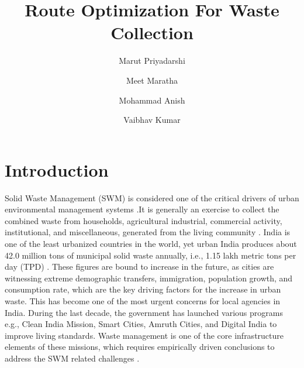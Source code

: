 \documentclass[12pt]{article}
\begin{document}

\title{Route Optimization For Waste Collection\\}
\date{}
\author[1]{Marut Priyadarshi}
\author[2]{Meet Maratha}
\author[3]{Mohammad Anish}
\author[4]{Vaibhav Kumar}

\maketitle

\section{Introduction}

Solid Waste Management (SWM) is considered one of the critical drivers of urban environmental management systems \cite{hoornweg2012waste}.It is generally an exercise to collect the combined waste from households, agricultural industrial, commercial activity, institutional, and miscellaneous, generated from the living community \cite{GUPTA2015206}. India is one of the least urbanized countries in the world, yet urban India produces about 42.0 million tons of municipal solid waste annually, i.e., 1.15 lakh metric tons per day (TPD) \cite{SHARMA2021293,GUPTA2015206}. These figures are bound to increase in the future, as cities are witnessing extreme demographic transfers, immigration, population growth, and consumption rate, which are the key driving factors for the increase in urban waste. This has become one of the most urgent concerns for local agencies in India. During the last decade, the government has launched various programs e.g., Clean India Mission, Smart Cities, Amruth Cities, and Digital India to improve living standards. Waste management is one of the core infrastructure elements of these missions, which requires empirically driven conclusions to address the SWM related challenges \cite{CHEELA2021419}. 
\end{document}
